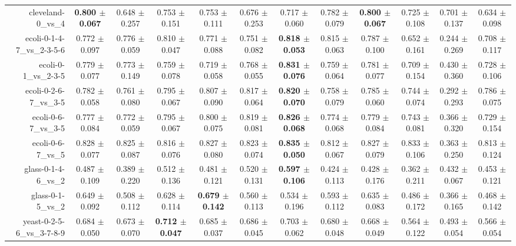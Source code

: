 \begin{table}[!ht]
{\begin{tabular}{r c c c c c c c c c c c}
cleveland-0\_vs\_4 & \textbf{0.800 $\pm$ 0.067} & 0.648 $\pm$ 0.257 & 0.753 $\pm$ 0.151 & 0.753 $\pm$ 0.111 & 0.676 $\pm$ 0.253 & 0.717 $\pm$ 0.060 & 0.782 $\pm$ 0.079 & \textbf{0.800 $\pm$ 0.067} & 0.725 $\pm$ 0.108 & 0.701 $\pm$ 0.137 & 0.634 $\pm$ 0.098 \\
ecoli-0-1-4-7\_vs\_2-3-5-6 & 0.772 $\pm$ 0.097 & 0.776 $\pm$ 0.059 & 0.810 $\pm$ 0.047 & 0.771 $\pm$ 0.088 & 0.751 $\pm$ 0.082 & \textbf{0.818 $\pm$ 0.053} & 0.815 $\pm$ 0.063 & 0.787 $\pm$ 0.100 & 0.652 $\pm$ 0.161 & 0.244 $\pm$ 0.269 & 0.708 $\pm$ 0.117 \\
ecoli-0-1\_vs\_2-3-5 & 0.779 $\pm$ 0.077 & 0.773 $\pm$ 0.149 & 0.759 $\pm$ 0.078 & 0.719 $\pm$ 0.058 & 0.768 $\pm$ 0.055 & \textbf{0.831 $\pm$ 0.076} & 0.759 $\pm$ 0.064 & 0.781 $\pm$ 0.077 & 0.709 $\pm$ 0.154 & 0.430 $\pm$ 0.360 & 0.728 $\pm$ 0.106 \\
ecoli-0-2-6-7\_vs\_3-5 & 0.782 $\pm$ 0.058 & 0.761 $\pm$ 0.080 & 0.795 $\pm$ 0.067 & 0.807 $\pm$ 0.090 & 0.817 $\pm$ 0.064 & \textbf{0.820 $\pm$ 0.070} & 0.758 $\pm$ 0.079 & 0.785 $\pm$ 0.060 & 0.744 $\pm$ 0.074 & 0.292 $\pm$ 0.293 & 0.786 $\pm$ 0.075 \\
ecoli-0-6-7\_vs\_3-5 & 0.777 $\pm$ 0.084 & 0.772 $\pm$ 0.059 & 0.795 $\pm$ 0.067 & 0.800 $\pm$ 0.075 & 0.819 $\pm$ 0.081 & \textbf{0.826 $\pm$ 0.068} & 0.774 $\pm$ 0.068 & 0.779 $\pm$ 0.084 & 0.743 $\pm$ 0.081 & 0.366 $\pm$ 0.320 & 0.729 $\pm$ 0.154 \\
ecoli-0-6-7\_vs\_5 & 0.828 $\pm$ 0.077 & 0.825 $\pm$ 0.087 & 0.816 $\pm$ 0.076 & 0.827 $\pm$ 0.080 & 0.823 $\pm$ 0.074 & \textbf{0.835 $\pm$ 0.050} & 0.812 $\pm$ 0.067 & 0.827 $\pm$ 0.079 & 0.833 $\pm$ 0.106 & 0.363 $\pm$ 0.250 & 0.813 $\pm$ 0.124 \\
glass-0-1-4-6\_vs\_2 & 0.487 $\pm$ 0.109 & 0.389 $\pm$ 0.220 & 0.512 $\pm$ 0.136 & 0.481 $\pm$ 0.121 & 0.520 $\pm$ 0.131 & \textbf{0.597 $\pm$ 0.106} & 0.424 $\pm$ 0.113 & 0.428 $\pm$ 0.176 & 0.362 $\pm$ 0.211 & 0.432 $\pm$ 0.067 & 0.453 $\pm$ 0.121 \\
glass-0-1-5\_vs\_2 & 0.649 $\pm$ 0.092 & 0.508 $\pm$ 0.112 & 0.628 $\pm$ 0.114 & \textbf{0.679 $\pm$ 0.142} & 0.560 $\pm$ 0.113 & 0.534 $\pm$ 0.196 & 0.593 $\pm$ 0.112 & 0.635 $\pm$ 0.083 & 0.486 $\pm$ 0.172 & 0.366 $\pm$ 0.165 & 0.468 $\pm$ 0.142 \\
yeast-0-2-5-6\_vs\_3-7-8-9 & 0.684 $\pm$ 0.050 & 0.673 $\pm$ 0.070 & \textbf{0.712 $\pm$ 0.047} & 0.685 $\pm$ 0.037 & 0.686 $\pm$ 0.045 & 0.703 $\pm$ 0.062 & 0.680 $\pm$ 0.048 & 0.668 $\pm$ 0.049 & 0.564 $\pm$ 0.122 & 0.493 $\pm$ 0.054 & 0.566 $\pm$ 0.054 \\

\end{tabular}}
\end{table}

